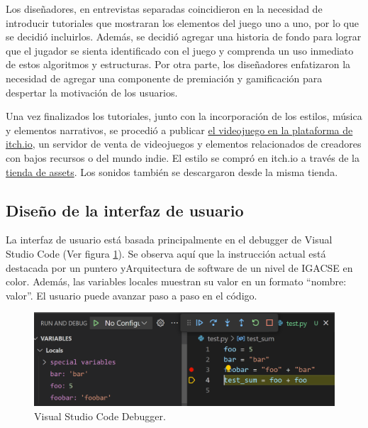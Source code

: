 Los diseñadores, en entrevistas separadas coincidieron en la necesidad de introducir tutoriales que mostraran los elementos del juego uno a uno, por lo que se decidió incluirlos. Además, se decidió agregar una historia de fondo para lograr que el jugador se sienta identificado con el juego y comprenda un uso inmediato de estos algoritmos y estructuras. Por otra parte, los diseñadores enfatizaron la necesidad de agregar una componente de premiación y gamificación para despertar la motivación de los usuarios.

Una vez finalizados los tutoriales, junto con la incorporación de los estilos, música y elementos narrativos, se procedió a publicar \href{https://alasaltum.itch.io/igasce}{el videojuego en la plataforma de itch.io}, un servidor de venta de videojuegos y elementos relacionados de creadores con bajos recursos o del mundo indie. El estilo se compró en itch.io a través de la \href{https://azagaya.itch.io/sci-fi-theme}{tienda de assets}. Los sonidos también se descargaron desde la misma tienda.


\subsection{Diseño de la interfaz de usuario}

La interfaz de usuario está basada principalmente en el debugger de Visual Studio Code \cite{vscode} (Ver figura \ref{VScodeDebugger}). Se observa aquí que la instrucción actual está destacada por un puntero yArquitectura de software de un nivel de IGACSE en color. Además, las variables locales muestran su valor en un formato ``nombre: valor''. El usuario puede avanzar paso a paso en el código.

\begin{figure}[h]
	\centering
	\includegraphics[scale=0.3]{imagenes/VScodeDebugger.png}
	\caption{Visual Studio Code Debugger.}
	\label{VScodeDebugger}
\end{figure}

